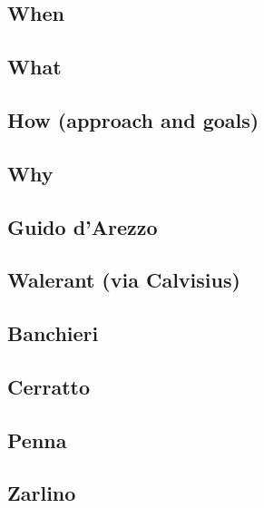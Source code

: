 \documentclass[]{book}
\theoremstyle{definition}
\theoremstyle{definition}
\theoremstyle{definition}
\theoremstyle{remark}
\begin{document}
\hypertarget{when}{%
\subsection{When}\label{when}}

\hypertarget{what}{%
\subsection{What}\label{what}}

\hypertarget{how-approach-and-goals}{%
\subsection{How (approach and goals)}\label{how-approach-and-goals}}

\hypertarget{why}{%
\subsection{Why}\label{why}}

\hypertarget{guido-darezzo}{%
\subsection{Guido d'Arezzo}\label{guido-darezzo}}

\hypertarget{walerant-via-calvisius}{%
\subsection{Walerant (via Calvisius)}\label{walerant-via-calvisius}}

\hypertarget{banchieri}{%
\subsection{Banchieri}\label{banchieri}}

\hypertarget{cerratto}{%
\subsection{Cerratto}\label{cerratto}}

\hypertarget{penna}{%
\subsection{Penna}\label{penna}}

\hypertarget{zarlino}{%
\subsection{Zarlino}\label{zarlino}}
\end{document}
